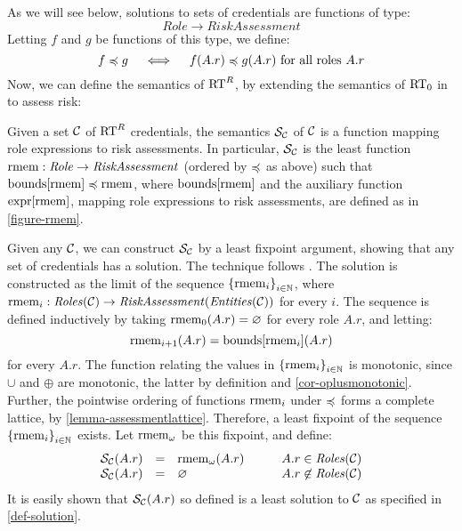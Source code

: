As we will see below, solutions to sets of credentials are 
functions of type:
$$
\mathit{Role} \rightarrow \mathit{RiskAssessment}
$$ 
Letting $f$ and $g$ be functions of this type, we define:
$$
f \preccurlyeq g \quad\iff\quad f(A.r) \preccurlyeq g(A.r) \text{ for all roles } A.r
$$
Now, we can define the semantics of $\text{RT}^R$, by extending the
semantics of $\text{RT}_0$ in \cite{Li:2003-02} to assess risk:
\begin{definition} 
\label{def-solution}
Given a set $\mathcal{C}$ of $\text{RT}^R$ credentials, the semantics
$\mathcal{S}_{\mathcal{C}}$ of $\mathcal{C}$ is a function mapping role expressions to risk
assessments.  In particular, $\mathcal{S}_{\mathcal{C}}$ is the least function
$\mathrm{rmem} : \mathit{Role} \rightarrow \mathit{RiskAssessment}$ 
(ordered by $\preccurlyeq$ as above) such that $\mathrm{bounds}[\mathrm{rmem}] \preccurlyeq \mathrm{rmem}$,
where $\mathrm{bounds}[\mathrm{rmem}]$ and the auxiliary function $\mathrm{expr}[\mathrm{rmem}]$, mapping
role expressions to risk assessments, are defined as in \autoref{figure-rmem}.
\end{definition}

Given any $\mathcal{C}$, we can construct $\mathcal{S}_{\mathcal{C}}$ by a least
fixpoint argument, showing that any set of credentials has a solution.
The technique follows \cite{Li:2003-02}.  The solution is constructed
as the limit of the sequence $\left\{\mathrm{rmem}_i\right\}_{i \in \mathbb{N}}$,
where $\mathrm{rmem}_i : \mathit{Roles}(\mathcal{C}) \rightarrow 
\mathit{RiskAssessment}(\mathit{Entities}(\mathcal{C}))$
for every $i$.  The sequence is defined inductively by taking 
$\mathrm{rmem}_0(A.r) = \varnothing$ for every role $A.r$, and letting:
$$
\mathrm{rmem}_{i+1}(A.r) = \mathrm{bounds}[\mathrm{rmem}_i](A.r)
$$ 
for every $A.r$.  The function relating the values in
$\left\{\mathrm{rmem}_i\right\}_{i \in \mathbb{N}}$ is monotonic, since $\cup$ and
$\oplus$ are monotonic, the latter by definition and
\autoref{cor-oplusmonotonic}.  Further, the pointwise ordering of
functions $\mathrm{rmem}_i$ under $\preccurlyeq$ forms a complete lattice, by
\autoref{lemma-assessmentlattice}.  Therefore, a least fixpoint of the
sequence $\left\{\mathrm{rmem}_i\right\}_{i \in \mathbb{N}}$ exists.  Let 
$\mathrm{rmem}_\omega$ be this fixpoint, and define:
$$
\begin{array}{rclr}
\mathcal{S}_{\mathcal{C}}(A.r) &=& \mathrm{rmem}_\omega(A.r) \qquad &  A.r \in \mathit{Roles}(\mathcal{C}) \\
\mathcal{S}_{\mathcal{C}}(A.r) &=& \varnothing & A.r \not\in \mathit{Roles}(\mathcal{C})
\end{array}
$$
It is easily shown that $\mathcal{S}_{\mathcal{C}}(A.r)$ so defined is a
least solution to $\mathcal{C}$ as specified in \autoref{def-solution}.

